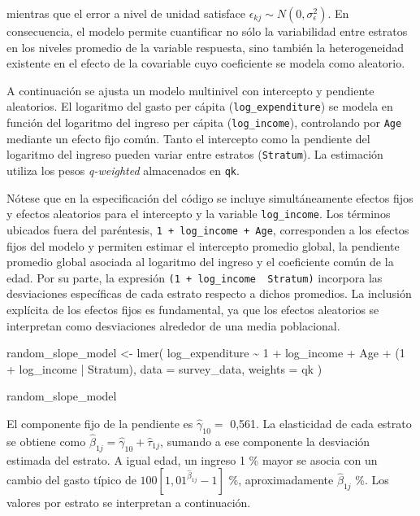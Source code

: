 \documentclass[
  spanish,
  11pt,
  letterpaper,
  oneside,
  open=any]{scrbook}
\newenvironment{Shaded}{\begin{snugshade}}{\end{snugshade}}
\newcommand{\AttributeTok}[1]{\textcolor[rgb]{0.40,0.45,0.13}{#1}}
\newcommand{\DecValTok}[1]{\textcolor[rgb]{0.68,0.00,0.00}{#1}}
\newcommand{\FunctionTok}[1]{\textcolor[rgb]{0.28,0.35,0.67}{#1}}
\newcommand{\NormalTok}[1]{\textcolor[rgb]{0.00,0.23,0.31}{#1}}
\newcommand{\OtherTok}[1]{\textcolor[rgb]{0.00,0.23,0.31}{#1}}
\newcommand{\SpecialCharTok}[1]{\textcolor[rgb]{0.37,0.37,0.37}{#1}}
\begin{document}
mientras que el error a nivel de unidad satisface
\(\epsilon_{kj} \sim N(0,\sigma_{\epsilon}^{2})\). En consecuencia, el
modelo permite cuantificar no sólo la variabilidad entre estratos en los
niveles promedio de la variable respuesta, sino también la
heterogeneidad existente en el efecto de la covariable cuyo coeficiente
se modela como aleatorio.

A continuación se ajusta un modelo multinivel con intercepto y pendiente
aleatorios. El logaritmo del gasto per cápita
(\texttt{log\_expenditure}) se modela en función del logaritmo del
ingreso per cápita (\texttt{log\_income}), controlando por \texttt{Age}
mediante un efecto fijo común. Tanto el intercepto como la pendiente del
logaritmo del ingreso pueden variar entre estratos (\texttt{Stratum}).
La estimación utiliza los pesos \emph{q-weighted} almacenados en
\texttt{qk}.

Nótese que en la especificación del código se incluye simultáneamente
efectos fijos y efectos aleatorios para el intercepto y la variable
\texttt{log\_income}. Los términos ubicados fuera del paréntesis,
\texttt{1\ +\ log\_income\ +\ Age}, corresponden a los efectos fijos del
modelo y permiten estimar el intercepto promedio global, la pendiente
promedio global asociada al logaritmo del ingreso y el coeficiente común
de la edad. Por su parte, la expresión
\texttt{(1\ +\ log\_income\ \textbar{}\ Stratum)} incorpora las
desviaciones específicas de cada estrato respecto a dichos promedios. La
inclusión explícita de los efectos fijos es fundamental, ya que los
efectos aleatorios se interpretan como desviaciones alrededor de una
media poblacional.

\begin{Shaded}
\begin{Highlighting}[]
\NormalTok{random\_slope\_model }\OtherTok{\textless{}{-}} \FunctionTok{lmer}\NormalTok{(}
\NormalTok{  log\_expenditure }\SpecialCharTok{\textasciitilde{}} \DecValTok{1} \SpecialCharTok{+}\NormalTok{ log\_income }\SpecialCharTok{+}\NormalTok{ Age }\SpecialCharTok{+}\NormalTok{ (}\DecValTok{1} \SpecialCharTok{+}\NormalTok{ log\_income }\SpecialCharTok{|}\NormalTok{ Stratum),}
  \AttributeTok{data =}\NormalTok{ survey\_data,}
  \AttributeTok{weights =}\NormalTok{ qk}
\NormalTok{)}

\NormalTok{random\_slope\_model}
\end{Highlighting}
\end{Shaded}

El componente fijo de la pendiente es \(\hat\gamma_{10}=\) 0,561. La
elasticidad de cada estrato se obtiene como
\(\hat\beta_{1j}=\hat\gamma_{10}+\hat\tau_{1j}\), sumando a ese
componente la desviación estimada del estrato. A igual edad, un ingreso
1 \% mayor se asocia con un cambio del gasto típico de
\(100[1{,}01^{\hat\beta_{1j}}-1]\) \%, aproximadamente
\(\hat\beta_{1j}\) \%. Los valores por estrato se interpretan a
continuación.
\end{document}
